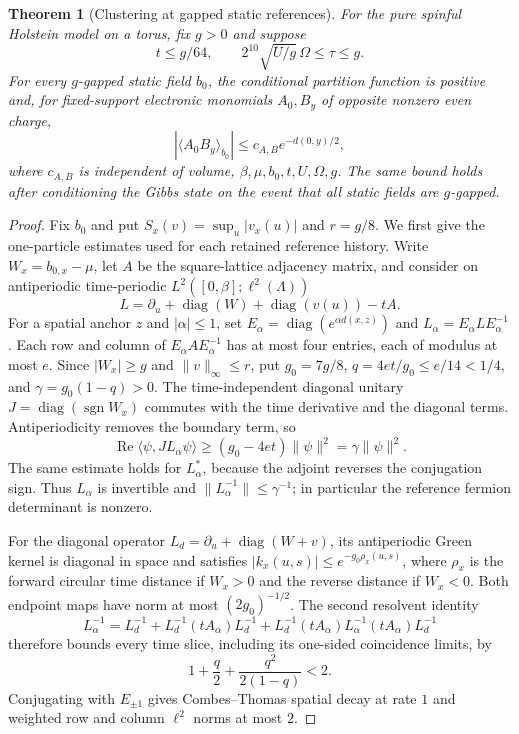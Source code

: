 \documentclass[11pt]{article}
\newtheorem{theorem}{Theorem}[section]
\theoremstyle{definition}
\theoremstyle{remark}
\begin{document}
\begin{theorem}[Clustering at gapped static references]\label{thm:C}
For the pure spinful Holstein model on a torus, fix $g>0$ and suppose
\[
 t\leq g/64,\qquad 2^{10}\sqrt{U/g}\,\Omega\leq\tau\leq g.
\]
For every $g$-gapped static field $b_0$, the conditional partition function is positive and, for fixed-support electronic monomials $A_0,B_y$ of opposite nonzero even charge,
\[
 |\langle A_0B_y\rangle_{b_0}|\leq c_{A,B}e^{-d(0,y)/2},
\]
where $c_{A,B}$ is independent of volume, $\beta,\mu,b_0,t,U,\Omega,g$. The same bound holds after conditioning the Gibbs state on the event that all static fields are $g$-gapped.
\end{theorem}

\begin{proof}[Proof]
Fix $b_0$ and put $S_x(v)=\sup_u|v_x(u)|$ and $r=g/8$. We first give the one-particle estimates used for each retained reference history. Write $W_x=b_{0,x}-\mu$, let $A$ be the square-lattice adjacency matrix, and consider on antiperiodic time-periodic $L^2([0,\beta];\ell^2(\Lambda))$
\[
 L=\partial_u+\operatorname{diag}(W)+\operatorname{diag}(v(u))-tA.
\]
For a spatial anchor $z$ and $|\alpha|\leq1$, set $E_\alpha=\operatorname{diag}(e^{\alpha d(x,z)})$ and $L_\alpha=E_\alpha L E_\alpha^{-1}$. Each row and column of $E_\alpha A E_\alpha^{-1}$ has at most four entries, each of modulus at most $e$. Since $|W_x|\geq g$ and $\|v\|_\infty\leq r$, put $g_0=7g/8$, $q=4et/g_0\leq e/14<1/4$, and $\gamma=g_0(1-q)>0$. The time-independent diagonal unitary $J=\operatorname{diag}(\operatorname{sgn}W_x)$ commutes with the time derivative and the diagonal terms. Antiperiodicity removes the boundary term, so
\[
 \operatorname{Re}\langle\psi,J L_\alpha\psi\rangle\geq(g_0-4et)\|\psi\|^2=\gamma\|\psi\|^2.
\]
The same estimate holds for $L_\alpha^*$, because the adjoint reverses the conjugation sign. Thus $L_\alpha$ is invertible and $\|L_\alpha^{-1}\|\leq\gamma^{-1}$; in particular the reference fermion determinant is nonzero.

For the diagonal operator $L_d=\partial_u+\operatorname{diag}(W+v)$, its antiperiodic Green kernel is diagonal in space and satisfies $|k_x(u,s)|\leq e^{-g_0\rho_x(u,s)}$, where $\rho_x$ is the forward circular time distance if $W_x>0$ and the reverse distance if $W_x<0$. Both endpoint maps have norm at most $(2g_0)^{-1/2}$. The second resolvent identity
\[
 L_\alpha^{-1}=L_d^{-1}+L_d^{-1}(tA_\alpha)L_d^{-1}
 +L_d^{-1}(tA_\alpha)L_\alpha^{-1}(tA_\alpha)L_d^{-1}
\]
therefore bounds every time slice, including its one-sided coincidence limits, by
\[
 1+\frac q2+\frac{q^2}{2(1-q)}<2.
\]
Conjugating with $E_{\pm1}$ gives Combes--Thomas spatial decay at rate $1$ and weighted row and column $\ell^2$ norms at most $2$.


\end{proof}
\end{document}
